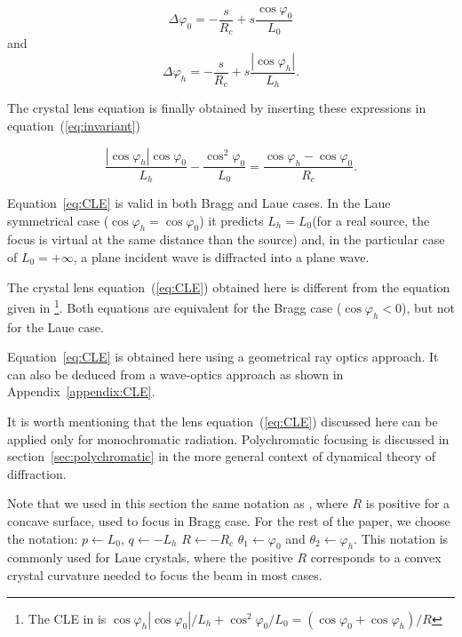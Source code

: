 \documentclass[preprint]{iucr}              %
\newcommand{\inred}[1]{{\color{red}#1}}
\begin{document}
\begin{equation}
\label{eq:angles}
\Delta \varphi_0 =  - \frac{s}{R_c} + s \frac{\cos\varphi_0}{L_0}
\end{equation}
and 
\begin{equation}
\label{eq:angles2}
\Delta \varphi_h = - \frac{s}{R_c} +  s \frac{|\cos\varphi_h|}{L_h}.
\end{equation}

The crystal lens equation is finally obtained by inserting these expressions in equation~(\ref{eq:invariant})

\begin{equation}
\label{eq:CLE}
\frac{|\cos\varphi_h| \cos\varphi_0}{L_h} - \frac{\cos^2\varphi_0}{L_0} = \frac{\cos\varphi_h - \cos\varphi_0}{R_c}.
\end{equation}


Equation~\ref{eq:CLE} is valid in both Bragg and Laue cases. In the Laue symmetrical case ($\cos\varphi_h=\cos\varphi_0$) it predicts $L_h=L_0$(for a real source, the focus is virtual at the same distance than the source) and, in the particular case of $L_0=+\infty$, a plane incident wave is diffracted into a plane wave.

The crystal lens equation~(\ref{eq:CLE}) obtained here is different from the equation given in \cite{CK}\footnote{The CLE in \cite{CK} is 
$
\cos\varphi_h |\cos\varphi_0|/L_h + \cos^2\varphi_0/L_0 = (\cos\varphi_0 + \cos\varphi_h)/R 
$}. Both equations are equivalent for the Bragg case ($\cos\varphi_h<0$), but not for the Laue case.

Equation~\ref{eq:CLE} is obtained here using a geometrical ray optics approach. It can also be deduced from a wave-optics approach as shown in Appendix~\ref{appendix:CLE}. 

It is worth mentioning that the lens equation~(\ref{eq:CLE}) discussed here can be applied only for monochromatic radiation. Polychromatic focusing is discussed in section~\ref{sec:polychromatic} in the more general context of dynamical theory of diffraction.

Note that we used in this section the same notation as \cite{CK}\inred{, where $R$ is positive for a concave surface, used to focus in Bragg case.} For the rest of the paper, we choose the notation: $p \leftarrow L_0$, $q \leftarrow -L_h$ $R \leftarrow -R_c$ $\theta_1 \leftarrow \varphi_0$ and $\theta_2 \leftarrow \varphi_h$.
\inred{This notation is commonly used for Laue crystals, where the positive $R$ corresponds to a convex crystal curvature needed to focus the beam in most cases.}
\end{document}

